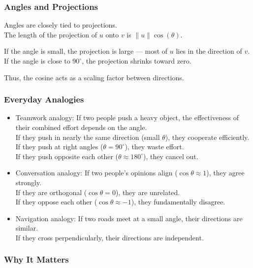 \documentclass[
  letterpaper,
  DIV=11,
  numbers=noendperiod]{scrreprt}
\begin{document}
\subsubsection{Angles and Projections}\label{angles-and-projections}

Angles are closely tied to projections.\\
The length of the projection of \(u\) onto \(v\) is
\(\|u\|\cos(\theta)\).

If the angle is small, the projection is large --- most of \(u\) lies in
the direction of \(v\).\\
If the angle is close to \(90^\circ\), the projection shrinks toward
zero.

Thus, the cosine acts as a scaling factor between directions.

\subsubsection{Everyday Analogies}\label{everyday-analogies-4}

\begin{itemize}
\item
  Teamwork analogy: If two people push a heavy object, the effectiveness
  of their combined effort depends on the angle.\\
  If they push in nearly the same direction (small \(\theta\)), they
  cooperate efficiently.\\
  If they push at right angles (\(\theta = 90^\circ\)), they waste
  effort.\\
  If they push opposite each other (\(\theta \approx 180^\circ\)), they
  cancel out.
\item
  Conversation analogy: If two people's opinions align
  (\(\cos \theta \approx 1\)), they agree strongly.\\
  If they are orthogonal (\(\cos \theta = 0\)), they are unrelated.\\
  If they oppose each other (\(\cos \theta \approx -1\)), they
  fundamentally disagree.
\item
  Navigation analogy: If two roads meet at a small angle, their
  directions are similar.\\
  If they cross perpendicularly, their directions are independent.
\end{itemize}

\subsubsection{Why It Matters}\label{why-it-matters-6}
\end{document}
